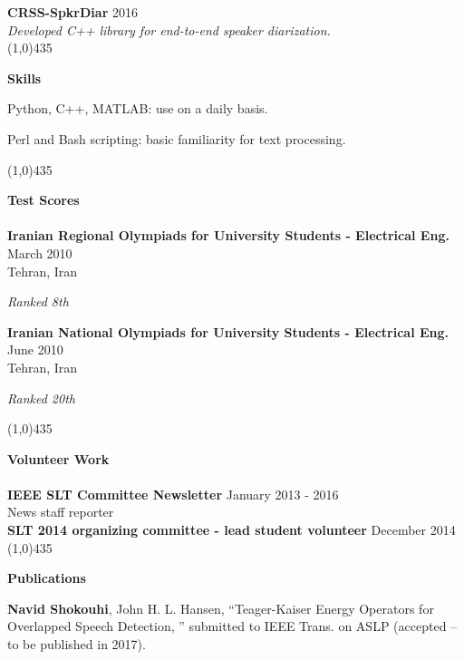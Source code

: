\documentclass[doublespacing]{utdthesis}
\begin{document}
\begin{vita}
{\bf CRSS-SpkrDiar} \hfill { 2016}\\
{\it Developed C++ library for end-to-end speaker diarization.}\\
\line(1,0){435}

\textbf{\sc Skills\\} 
\begin{list2}
	\item Python, C++, MATLAB: use on a daily basis.
	\item Perl and Bash scripting: basic familiarity for text processing.
\end{list2}
\vspace{0mm}
\line(1,0){435}

\textbf{\sc Test Scores\\\\}
{\bf Iranian Regional Olympiads for University Students - Electrical Eng.} \hfill {March 2010}\\
Tehran, Iran
\begin{list1}
	\item[] {\it Ranked 8th}
\end{list1}
\vspace{-0mm}
{\bf Iranian National Olympiads for University Students - Electrical Eng.} \hfill {June 2010}\\
Tehran, Iran
\begin{list1}
	\vspace{-0mm}
	\item[] {\it Ranked 20th}
\end{list1}
\line(1,0){435}
\vspace{0mm}

\textbf{\sc Volunteer Work\\\\}
\vspace{0mm}
{\bf IEEE SLT Committee Newsletter} \hfill {January 2013 - 2016}\\
News staff reporter\\

{\bf SLT 2014 organizing committee - lead student volunteer} \hfill {December 2014}\\
\vspace{0mm}
\line(1,0){435}

\textbf{\sc Publications\\}

{\bf Navid Shokouhi}, John H. L. Hansen, ``Teager-Kaiser Energy Operators for Overlapped Speech Detection, '' submitted to IEEE Trans. on ASLP (accepted -- to be published in 2017). \\


\end{vita}
\end{document}
